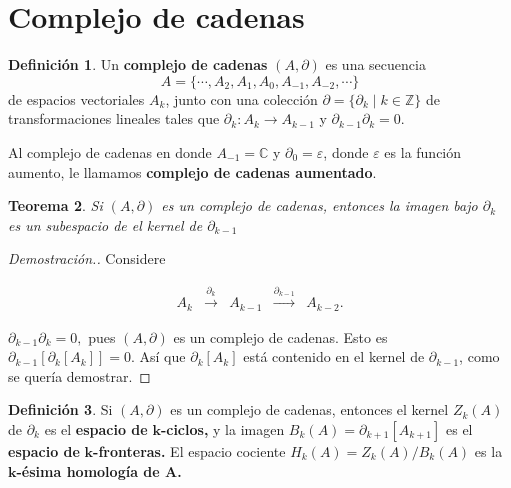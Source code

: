 \documentclass[12pt]{book}
\newtheorem{theorem}{Teorema}[section]
\theoremstyle{definition}
\newtheorem{definition}[theorem]{Definición}
\newcounter{in}
\newcounter{ini}
\begin{document}
\section{Complejo de cadenas}
\label{com-cad}

\begin{definition}
  Un \textbf{complejo de cadenas} $(A,\partial)$ es una secuencia
  $$A=\{\cdots,A_{2},A_{1},A_{0},A_{-1},A_{-2},\cdots\}$$
  de espacios vectoriales $A_{k}$, junto con una colección
  $\partial=\{\partial_{k}\mid k \in \mathbb{Z}\}$ de transformaciones
  lineales tales que $\partial_{k}:A_{k}\rightarrow A_{k-1}$ y
  $\partial_{k-1}\partial_{k}=0.$

  Al complejo de cadenas en donde $A_{-1}=\mathbb{C}$ y $\partial_{0}=\varepsilon$,
  donde $\varepsilon$ es la función aumento, le llamamos \textbf{complejo de cadenas aumentado}.
\end{definition}

\begin{theorem}
  Si $(A,\partial)$ es un complejo de cadenas, entonces la imagen bajo
  $\partial_{k}$ es un subespacio de el kernel de $\partial_{k-1}$
\end{theorem}
\begin{proof}[Demostración.]
  Considere
  \begin{small}
    \[
    \begin{array}{ccccc}
      A_{k} & \stackrel{\partial_{k}}{\longrightarrow} & A_{k-1} &
      \stackrel{\partial_{k-1}}{\longrightarrow} & A_{k-2}.
    \end{array} 
    \]
  \end{small}
  $\partial_{k-1}\partial_{k}=0,$ pues $(A,\partial)$ es un complejo
  de cadenas. Esto es $\partial_{k-1}[\partial_{k}[A_{k}]]=0.$ Así que
  $\partial_{k}[A_{k}]$ está contenido en el kernel de
  $\partial_{k-1}$, como se quería demostrar.
\end{proof}

\begin{definition}
  Si $(A,\partial)$ es un complejo de cadenas, entonces el kernel
  $Z_{k}(A)$ de $\partial_{k}$ es el\textbf{ espacio de} $\boldsymbol{k}$\textbf{-ciclos,} y
  la imagen $B_{k}(A)=\partial_{k+1}[A_{k+1}]$ es el \textbf{espacio
    de} $\boldsymbol{k}$\textbf{-fronteras.} El espacio cociente $H_{k}(A)=Z_{k}(A)/B_{k}(A)$
  es la $\boldsymbol{k}$\textbf{-ésima homología de A.}
\end{definition}
\end{document}
